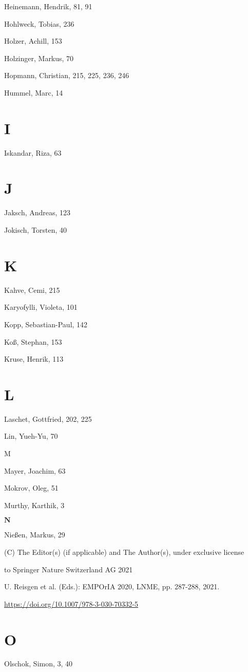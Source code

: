 \documentclass[10pt]{article}
\begin{document}
Heinemann, Hendrik, 81, 91

Hohlweck, Tobias, 236

Holzer, Achill, 153

Holzinger, Markus, 70

Hopmann, Christian, 215, 225, 236, 246

Hummel, Marc, 14

\section*{I}
Iskandar, Riza, 63

\section*{J}
Jaksch, Andreas, 123

Jokisch, Torsten, 40

\section*{K}
Kahve, Cemi, 215

Karyofylli, Violeta, 101

Kopp, Sebastian-Paul, 142

Koß, Stephan, 153

Kruse, Henrik, 113

\section*{L}
Laschet, Gottfried, 202, 225

Lin, Yueh-Yu, 70

M

Mayer, Joachim, 63

Mokrov, Oleg, 51

Murthy, Karthik, 3

$\mathbf{N}$

Nießen, Markus, 29

(C) The Editor(s) (if applicable) and The Author(s), under exclusive license

to Springer Nature Switzerland AG 2021

U. Reisgen et al. (Eds.): EMPOrIA 2020, LNME, pp. 287-288, 2021.

\href{https://doi.org/10.1007/978-3-030-70332-5}{https://doi.org/10.1007/978-3-030-70332-5}

\section*{O}
Olschok, Simon, 3, 40
\end{document}
